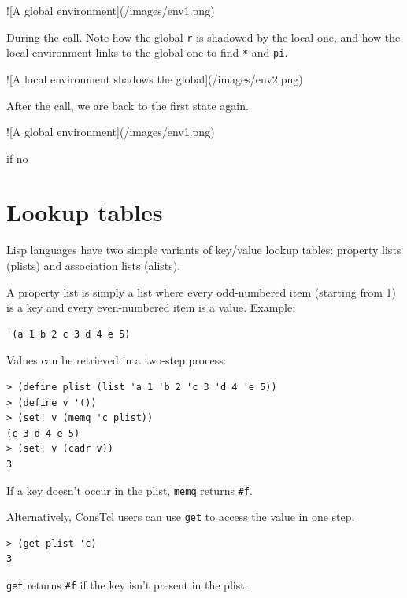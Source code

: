 \documentclass[twoside,9pt]{report}
\begin{document}
![A global environment](/images/env1.png)


During the call. Note how the global \texttt{r} is shadowed by the local one, and how the local environment links to the global one to find \texttt{*} and \texttt{pi}.


![A local environment shadows the global](/images/env2.png)


After the call, we are back to the first state again.


![A global environment](/images/env1.png)


if no {

\section{Lookup tables}
\label{lookup-tables}

Lisp languages have two simple variants of key/value lookup tables: property lists (plists) and association lists (alists).


A property list is simply a list where every odd-numbered item (starting from 1) is a key and every even-numbered item is a value. Example:

\noindent\makebox[\linewidth]{\rule{\linewidth}{0.4pt}}
\begin{lstlisting}
'(a 1 b 2 c 3 d 4 e 5)
\end{lstlisting}
\noindent\makebox[\linewidth]{\rule{\linewidth}{0.4pt}}

Values can be retrieved in a two-step process:

\noindent\makebox[\linewidth]{\rule{\linewidth}{0.4pt}}
\begin{lstlisting}
> (define plist (list 'a 1 'b 2 'c 3 'd 4 'e 5))
> (define v '())
> (set! v (memq 'c plist))
(c 3 d 4 e 5)
> (set! v (cadr v))
3
\end{lstlisting}
\noindent\makebox[\linewidth]{\rule{\linewidth}{0.4pt}}

If a key doesn't occur in the plist, \texttt{memq} returns \texttt{\#f}.


Alternatively, ConsTcl users can use \texttt{get} to access the value in one step.

\noindent\makebox[\linewidth]{\rule{\linewidth}{0.4pt}}
\begin{lstlisting}
> (get plist 'c)
3
\end{lstlisting}
\noindent\makebox[\linewidth]{\rule{\linewidth}{0.4pt}}

\texttt{get} returns \texttt{\#f} if the key isn't present in the plist.


}
\end{document}
